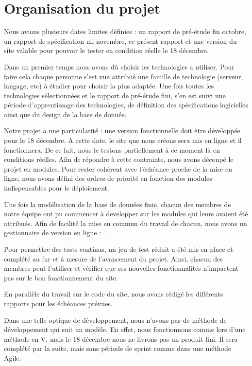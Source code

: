 \chapter{Organisation du projet}

Nous avions plusieurs dates limites définies : un rapport de pré-étude fin octobre, un rapport de spécification mi-novembre, ce présent rapport et une version du site valable pour pouvoir le tester en condition réelle le 18 décembre.

Dans un premier temps nous avons dû choisir les technologies a utiliser. Pour faire cela chaque personne s'est vue attribué une famille de technologie (serveur, langage, etc) à étudier pour choisir la plus adaptée.
Une fois toutes les technologies sélectionnées et le rapport de pré-étude fini, s'en est suivi une période d'apprentissage des technologies, de définition des spécifications logicielles ainsi que du design de la base de donnée.

Notre projet a une particularité : une version fonctionnelle doit être développée pour le 18 décembre. A cette date, le site que nous créons sera mis en ligne et il fonctionnera. De ce fait, nous le testons partiellement à ce moment là en conditions réelles. Afin de répondre à cette contrainte, nous avons découpé le projet en modules. Pour rester cohérent avec l'échéance proche de la mise en ligne, nous avons défini des ordres de priorité en fonction des modules indispensables pour le déploiement.

Une fois la modélisation de la base de données finie, chacun des membres de notre équipe ont pu commencer à developper sur les modules qui leurs avaient été attribués. Afin de facilité la mise en commun du travail de chacun, nous avons un gestionnaire de version en ligne : \git.

Pour permettre des tests continus, un jeu de test réduit a été mis en place et complété au fur et à mesure de l'avancement du projet. Ainsi, chacun des membres peut l'utiliser et vérifier que ses nouvelles fonctionnalités n'impactent pas sur le bon fonctionnement du site.

En parallèle du travail sur le code du site, nous avons rédigé les différents rapports pour les échéances prévues.

Dans une telle optique de développement, nous n'avons pas de méthode de développement qui suit un modèle. En effet, nous fonctionnons comme lors d'une méthode en V, mais le 18 décembre nous ne livrons pas un produit fini. Il sera complété par la suite, mais sans période de sprint comme dans une méthode Agile.